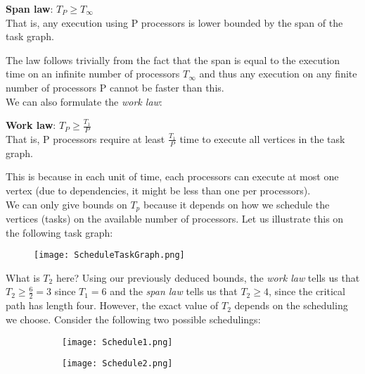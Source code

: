 \documentclass[main.tex]{subfiles}
\begin{document}
\begin{theorem}
  \textbf{Span law}: \(T_{P}\geq T_{\infty}\)\\
  That is, any execution using P processors is lower bounded by the span of the task graph.
\end{theorem}

\noindent The law follows trivially from the fact that the span is equal to the execution time on an infinite number of processors \(T_{\infty}\) and thus any execution on any finite number of processors P cannot be faster than this.\\[3mm]
We can also formulate the \textit{work law}:

\begin{theorem}
  \textbf{Work law}: \(T_{P}\geq \frac{T_{1}}{P}\)\\
  That is, P processors require at least \(\frac{T_{1}}{P}\) time to execute all vertices in the task graph.
\end{theorem}

\noindent This is because in each unit of time, each processors can execute at most one vertex (due to dependencies, it might be less than one per processors).\\
We can only give bounds on \(T_{p}\) because it depends on how we schedule the vertices (tasks) on the available number of processors. Let us illustrate this on the following task graph:

\begin{figure}[H]
    \centering
    \texttt{[image: ScheduleTaskGraph.png]}
\end{figure}

\noindent What is \(T_{2}\) here? Using our previously deduced bounds, the \textit{work law} tells us that \(T_{2}\geq \frac{6}{2}=3\) since \(T_{1}=6\) and the \textit{span law} tells us that \(T_{2}\geq 4\), since the critical path has length four. However, the exact value of \(T_{2}\) depends on the scheduling we choose. Consider the following two possible schedulings:

\begin{figure}[H]
    \begin{subfigure}[t]{.5\textwidth}
        \centering
        \texttt{[image: Schedule1.png]}
    \end{subfigure}
    \begin{subfigure}[t]{.5\textwidth}
        \centering
        \texttt{[image: Schedule2.png]}
    \end{subfigure}
\end{figure}
\end{document}
